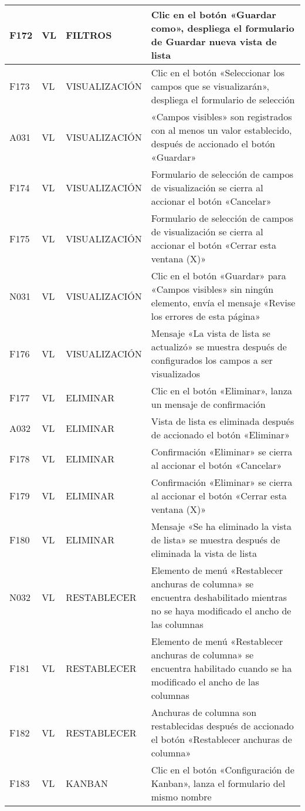 \begin{landscape}
\begin{longtable}[htb]{|l|l|p{5.0cm}|p{13.0cm}|}
F172 & VL & FILTROS & Clic en el botón «Guardar como», despliega el formulario de Guardar nueva vista de lista \\ \hline
F173 & VL & VISUALIZACIÓN & Clic en el botón «Seleccionar los campos que se visualizarán», despliega el formulario de selección \\ \hline
A031 & VL & VISUALIZACIÓN & «Campos visibles» son registrados con al menos un valor establecido, después de accionado el botón «Guardar» \\ \hline
F174 & VL & VISUALIZACIÓN & Formulario de selección de campos de visualización se cierra al accionar el botón «Cancelar» \\ \hline
F175 & VL & VISUALIZACIÓN & Formulario de selección de campos de visualización se cierra al accionar el botón «Cerrar esta ventana (X)» \\ \hline
N031 & VL & VISUALIZACIÓN & Clic en el botón «Guardar» para «Campos visibles» sin ningún elemento, envía el mensaje «Revise los errores de esta página» \\ \hline
F176 & VL & VISUALIZACIÓN & Mensaje «La vista de lista se actualizó» se muestra después de configurados los campos a ser visualizados \\ \hline
F177 & VL & ELIMINAR & Clic en el botón «Eliminar», lanza un mensaje de confirmación \\ \hline
A032 & VL & ELIMINAR & Vista de lista es eliminada después de accionado el botón «Eliminar» \\ \hline
F178 & VL & ELIMINAR & Confirmación «Eliminar» se cierra al accionar el botón «Cancelar» \\ \hline
F179 & VL & ELIMINAR & Confirmación «Eliminar» se cierra al accionar el botón «Cerrar esta ventana (X)» \\ \hline
F180 & VL & ELIMINAR & Mensaje «Se ha eliminado la vista de lista» se muestra después de eliminada la vista de lista \\ \hline
N032 & VL & RESTABLECER & Elemento de menú «Restablecer anchuras de columna» se encuentra deshabilitado mientras no se haya modificado el ancho de las columnas \\ \hline
F181 & VL & RESTABLECER & Elemento de menú «Restablecer anchuras de columna» se encuentra habilitado cuando se ha modificado el ancho de las columnas \\ \hline
F182 & VL & RESTABLECER & Anchuras de columna son restablecidas después de accionado el botón «Restablecer anchuras de columna» \\ \hline
F183 & VL & KANBAN & Clic en el botón «Configuración de Kanban», lanza el formulario del mismo nombre \\ \hline

\end{longtable}
\end{landscape}
